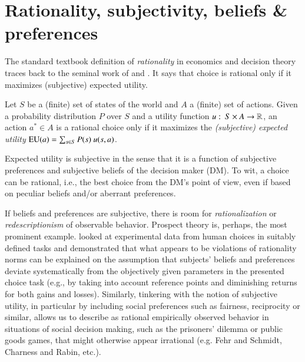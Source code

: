 \documentclass[fleqn,reqno,11pt]{article}
\begin{document}

\section{Rationality, subjectivity, beliefs \& preferences}
\label{sec:rati--subj}

The standard textbook definition of \textit{rationality} in economics and decision theory
traces back to the seminal work of \citet{Neumannvon-NeumannMorgenstern1944:Theory-of-Games}
and \citet{Savage1954:The-Foundations}. It says that choice is rational only if it maximizes
(subjective) expected utility.

\begin{definition}
  \label{def:rationality}
  Let $S$ be a (finite) set of states of the world and $A$ a (finite) set of actions. Given a
  probability distribution $P$ over $S$ and a utility function
  $u \thinspace \colon \thinspace S \times A \rightarrow \mathbb{R} $, an action $a^* \in A$ is a rational choice
  only if it maximizes the \emph{(subjective) expected utility}
  $\EU(a) = \sum_{s \in S} P(s) \ u(s, a)$.
\end{definition}

\noindent Expected utility is subjective in the sense that it is a function of subjective
preferences and subjective beliefs of the decision maker (DM). To wit, a choice can be
rational, i.e., the best choice from the DM's point of view, even if based on peculiar beliefs
and/or aberrant preferences. %

If beliefs and preferences are subjective, there is room for \emph{rationalization} or
\emph{redescriptionism} of observable behavior. Prospect theory is, perhaps, the most prominent
example. \citet{KahnemannTversky1979:Prospect-Theory} looked at experimental data from human
choices in suitably defined tasks and demonstrated that what appears to be violations of
rationality norms can be explained on the assumption that subjects' beliefs and preferences
deviate systematically from the objectively given parameters in the presented choice task
(e.g., by taking into account reference points and diminishing returns for both gains and
losses).  Similarly, tinkering with the notion of subjective utility, in particular by
including social preferences such as fairness, reciprocity or similar, allows us to describe as
rational empirically observed behavior in situations of social decision making, such as the
prisoners' dilemma or public goods games, that might otherwise appear irrational (e.g. Fehr and
Schmidt, Charness and Rabin, etc.).
\end{document}
